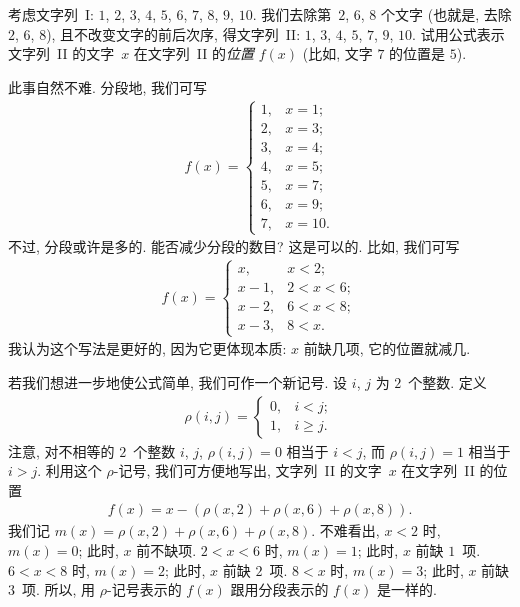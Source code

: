 \documentclass[../libro.tex]{subfiles}
\begin{document}
\begin{example}
    考虑文字列~I:
    \(1\), \(2\), \(3\), \(4\), \(5\),
    \(6\), \(7\), \(8\), \(9\), \(10\).
    我们去除第~\(2\), \(6\), \(8\) 个文字
    (也就是, 去除 \(2\), \(6\), \(8\)),
    且不改变文字的前后次序,
    得文字列~II:
    \(1\), \(3\), \(4\), \(5\), \(7\), \(9\), \(10\).
    试用公式表示%
    文字列~II 的文字~\(x\) 在文字列~II 的\emph{位置}
    \(f(x)\)
    (比如, 文字 \(7\) 的位置是 \(5\)).

    此事自然不难.
    分段地, 我们可写
    \begin{align*}
        f(x) =
        \begin{cases}
            1, & x = 1;  \\
            2, & x = 3;  \\
            3, & x = 4;  \\
            4, & x = 5;  \\
            5, & x = 7;  \\
            6, & x = 9;  \\
            7, & x = 10.
        \end{cases}
    \end{align*}
    不过, 分段或许是多的.
    能否减少分段的数目?
    这是可以的.
    比如,
    我们可写
    \begin{align*}
        f(x) =
        \begin{cases}
            x,     & x < 2;     \\
            x - 1, & 2 < x < 6; \\
            x - 2, & 6 < x < 8; \\
            x - 3, & 8 < x.
        \end{cases}
    \end{align*}
    我认为这个写法是更好的,
    因为它更体现本质:
    \(x\) 前缺几项, 它的位置就减几.

    若我们想进一步地使公式简单,
    我们可作一个新记号.
    设 \(i\), \(j\) 为 \(2\)~个整数.
    定义
    \begin{align*}
        \rho(i, j) =
        \begin{cases}
            0, & i < j;    \\
            1, & i \geq j.
        \end{cases}
    \end{align*}
    注意, 对不相等的 \(2\)~个整数 \(i\), \(j\),
    \(\rho(i, j) = 0\) 相当于 \(i < j\),
    而 \(\rho(i, j) = 1\) 相当于 \(i > j\).
    利用这个 \(\rho\)-记号, 我们可方便地写出,
    文字列~II 的文字~\(x\) 在文字列~II 的位置
    \begin{align*}
        f(x) = x - (\rho(x, 2) + \rho(x, 6) + \rho(x, 8)).
    \end{align*}
    我们记
    \(m(x) = \rho(x, 2) + \rho(x, 6) + \rho(x, 8)\).
    不难看出,
    \(x < 2\) 时, \(m(x) = 0\);
    此时, \(x\) 前不缺项.
    \(2 < x < 6\) 时, \(m(x) = 1\);
    此时, \(x\) 前缺 \(1\)~项.
    \(6 < x < 8\) 时, \(m(x) = 2\);
    此时, \(x\) 前缺 \(2\)~项.
    \(8 < x\) 时, \(m(x) = 3\);
    此时, \(x\) 前缺 \(3\)~项.
    所以, 用 \(\rho\)-记号表示的 \(f(x)\)
    跟用分段表示的 \(f(x)\) 是一样的.


\end{example}
\end{document}

